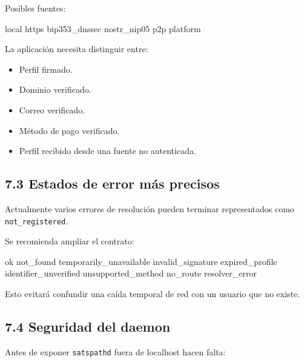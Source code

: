 \documentclass[
]{article}
\newenvironment{Shaded}{}{}
\newcommand{\NormalTok}[1]{#1}
\providecommand{\tightlist}{%
  \setlength{\itemsep}{0pt}\setlength{\parskip}{0pt}}
\begin{document}
Posibles fuentes:

\begin{Shaded}
\begin{Highlighting}[]
\NormalTok{local}
\NormalTok{https}
\NormalTok{bip353\_dnssec}
\NormalTok{nostr\_nip05}
\NormalTok{p2p}
\NormalTok{platform}
\end{Highlighting}
\end{Shaded}

La aplicación necesita distinguir entre:

\begin{itemize}
\tightlist
\item
  Perfil firmado.
\item
  Dominio verificado.
\item
  Correo verificado.
\item
  Método de pago verificado.
\item
  Perfil recibido desde una fuente no autenticada.
\end{itemize}

\hypertarget{estados-de-error-muxe1s-precisos}{%
\subsection{7.3 Estados de error más
precisos}\label{estados-de-error-muxe1s-precisos}}

Actualmente varios errores de resolución pueden terminar representados
como \texttt{not\_registered}.

Se recomienda ampliar el contrato:

\begin{Shaded}
\begin{Highlighting}[]
\NormalTok{ok}
\NormalTok{not\_found}
\NormalTok{temporarily\_unavailable}
\NormalTok{invalid\_signature}
\NormalTok{expired\_profile}
\NormalTok{identifier\_unverified}
\NormalTok{unsupported\_method}
\NormalTok{no\_route}
\NormalTok{resolver\_error}
\end{Highlighting}
\end{Shaded}

Esto evitará confundir una caída temporal de red con un usuario que no
existe.

\hypertarget{seguridad-del-daemon}{%
\subsection{7.4 Seguridad del daemon}\label{seguridad-del-daemon}}

Antes de exponer \texttt{satspathd} fuera de localhost hacen falta:
\end{document}
